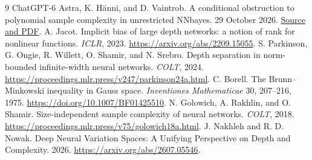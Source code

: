 \documentclass[11pt]{article}
\begin{document}
\begin{thebibliography}{9}
 ChatGPT-6 Astra, K. H\"anni, and D. Vaintrob.
A conditional obstruction to polynomial sample complexity in unrestricted NNbayes.
29 October 2026.
\href{https://github.com/kaarelh/AI-works/tree/main/neural-network-generalization/works-in-progress/conditional-nonpolynomial-learning}{Source and PDF}.
 A. Jacot.
Implicit bias of large depth networks: a notion of rank for nonlinear functions.
\emph{ICLR}, 2023. \url{https://arxiv.org/abs/2209.15055}.
 S. Parkinson, G. Ongie, R. Willett, O. Shamir,
and N. Srebro. Depth separation in norm-bounded infinite-width neural networks.
\emph{COLT}, 2024. \url{https://proceedings.mlr.press/v247/parkinson24a.html}.
 C. Borell.
The Brunn--Minkowski inequality in Gauss space.
\emph{Inventiones Mathematicae} 30, 207--216, 1975.
\url{https://doi.org/10.1007/BF01425510}.
 N. Golowich, A. Rakhlin, and O. Shamir.
Size-independent sample complexity of neural networks.
\emph{COLT}, 2018. \url{https://proceedings.mlr.press/v75/golowich18a.html}.
 J. Nakhleh and R. D. Nowak.
Deep Neural Variation Spaces: A Unifying Perspective on Depth and Complexity.
2026. \url{https://arxiv.org/abs/2607.05546}.
\end{thebibliography}
\end{document}
